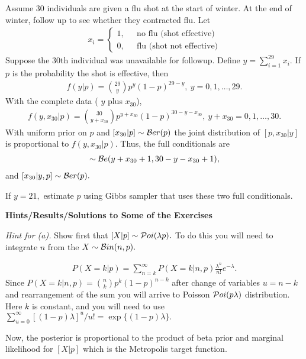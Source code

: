 \documentclass[12pt]{article}
\newcommand{\ba}{\begin{eqnarray*}}
\newcommand{\ea}{\end{eqnarray*}}
\begin{document}
\vspace*{0.3in}
Assume 30 individuals are given a flu shot at the start of winter.
At the end of winter, follow up to see whether they contracted
flu.
Let
\ba
x_i = \left\{ \begin{array}{ll}
1, & \mbox{~~no flu (shot effective)}\\
0, & \mbox{~~flu (shot not effective)}
\end{array} \right.
 \ea
 Suppose the 30th individual was unavailable for followup.
Define $y = \sum_{i=1}^{29} x_i.$
 If $p$ is the probability the shot is effective, then
\ba
f(y|p) = {{29}\choose{y}}  p^y (1-p)^{29-y},~ y=0,1,\dots, 29.
\ea
With the complete data ( $y$ plus $x_{30}$),
\ba
f(y, x_{30}|p) = {{30}\choose{y+x_{30}}}  p^{y+x_{30}} (1-p)^{30-y-x_{30}},~ y+x_{30}=0,1,\dots, 30.
\ea
With uniform prior on $p$  and $[x_{30}|p] \sim {\cal B}er(p)$
the joint distribution of $[p, x_{30}|y]$ is
proportional to $f(y, x_{30}|p).$
 Thus, the full conditionals are
\ba
[p | x_{30}, y] \sim  {\cal B}e(y+x_{30} + 1, 30 - y - x_{30}+1),
\ea
and $[x_{30}|y, p] \sim {\cal B}er(p).$

If $y=21,$ estimate $p$ using Gibbs sampler that uses these two full conditionals.

\newpage
\begin{center}
        { \Large \bf   Hints/Results/Solutions to Some of the Exercises}
\end{center}

\vspace{0.3in}



\vspace{0.3in}


{\sl Hint for (a).}  Show first that
$[X|p] \sim {\cal P}oi(\lambda p). $ To do this you will
need to integrate $n$ from the $X \sim {\cal B}in(n,p).$

\ba
P(X=k|p) = \sum_{n=k}^\infty P(X=k|n,p) \frac{\lambda^n}{n!} e^{-\lambda}.
\ea
Since $P(X=k|n,p)={{n}\choose{k}} p^k (1-p)^{n-k}$ after
change of variables $u=n-k$ and rearrangement of the sum
you will arrive to Poisson ${\cal P}oi(p \lambda)$ distribution.
 Here $k$ is constant, and you will need to use
 $\sum_{u=0}^\infty  [(1-p) \lambda]^u/u! = \exp\{(1-p) \lambda\}.$

 Now,  the posterior is proportional to the product of beta
 prior and marginal likelihood for $[X|p]$ which is the Metropolis
 target function.
\end{document}
